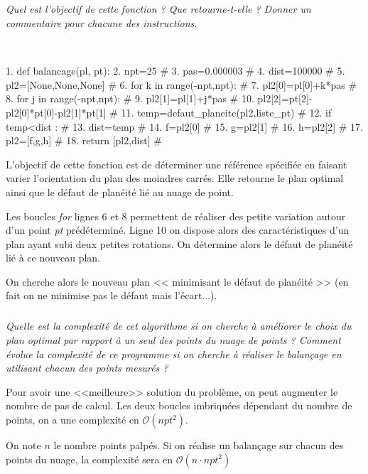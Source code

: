 \subparagraph{}
\textit{Quel est l'objectif de cette fonction ? Que retourne-t-elle ? Donner un commentaire pour chacune des instructions.}
\ifprof
\begin{corrige}
~\\
\begin{minipage}[c]{.57\linewidth}
\begin{python}
 1. def balancage(pl, pt):
 2.    npt=25                            #
 3.    pas=0.000003                      #
 4.    dist=100000                       #
 5.    pl2=[None,None,None]              #
 6.    for k in range(-npt,npt):         #
 7.        pl2[0]=pl[0]+k*pas            #
 8.        for j in range(-npt,npt):     #
 9.            pl2[1]=pl[1]+j*pas        #
10.            pl2[2]=pt[2]-pl2[0]*pt[0]-pl2[1]*pt[1]  #
11.            temp=defaut_planeite(pl2,liste_pt)	   #
12.            if temp<dist :         #
13.                dist=temp          #
14.                f=pl2[0]           #
15.                g=pl2[1]           #
16.                h=pl2[2]           #
17.    pl2=[f,g,h]                    #    
18.    return [pl2,dist]	      #
\end{python}
\end{minipage}\hfill
\begin{minipage}[c]{.43\linewidth}
L'objectif de cette fonction est de déterminer une référence spécifiée en faisant varier l'orientation du plan des moindres carrés. Elle retourne le plan optimal ainsi que le défaut de planéité lié au nuage de point.

Les boucles \textsl{for} lignes 6 et 8 permettent de réaliser des petite variation autour d'un point \textsl{pt} prédéterminé. 
Ligne 10 on dispose alors des caractéristiques d'un plan ayant subi deux petites rotations. 
On détermine alors le défaut de planéité lié à ce nouveau plan. 

On cherche alors le nouveau plan << minimisant le défaut de planéité >> (en fait on ne minimise pas le défaut mais l'écart...).

\end{minipage}
\end{corrige}
\else
\fi

\subparagraph{}
\textit{Quelle est la complexité de cet algorithme si on cherche à améliorer le choix du plan optimal par rapport à un seul des points du nuage de points ? Comment évolue la complexité de ce programme si on cherche à réaliser le balançage en utilisant chacun des points mesurés ?}
\ifprof
\begin{corrige}
Pour avoir une <<meilleure>> solution du problème, on peut augmenter le nombre de pas de calcul. Les deux boucles imbriquées dépendant du nombre de points, on a une complexité en $\mathcal{O}(npt^2)$.

On note $n$ le nombre points palpés. Si on réalise un balançage sur chacun des points du nuage, la complexité sera en $\mathcal{O}(n\cdot npt^2)$
\end{corrige}
\else
\fi
